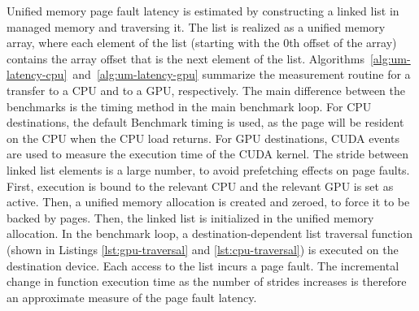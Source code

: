 Unified memory page fault latency is estimated by constructing a linked list in managed memory and traversing it.
The list is realized as a unified memory array, where each element of the list (starting with the 0th offset of the array) contains the array offset that is the next element of the list.
Algorithms~\ref{alg:um-latency-cpu}~and~\ref{alg:um-latency-gpu} summarize the measurement routine for a transfer to a CPU and to a GPU, respectively.
The main difference between the benchmarks is the timing method in the main benchmark loop.
For CPU destinations, the default Benchmark timing is used, as the page will be resident on the CPU when the CPU load returns.
For GPU destinations, CUDA events are used to measure the execution time of the CUDA kernel.
The stride between linked list elements is a large number, to avoid prefetching effects on page faults.
First, execution is bound to the relevant CPU and the relevant GPU is set as active.
Then, a unified memory allocation is created and zeroed, to force it to be backed by pages.
Then, the linked list is initialized in the unified memory allocation.
In the benchmark loop, a destination-dependent list traversal function (shown in Listings \ref{lst:gpu-traversal} and \ref{lst:cpu-traversal}) is executed on the destination device.
Each access to the list incurs a page fault.
The incremental change in function execution time as the number of strides increases is therefore an approximate measure of the page fault latency.


